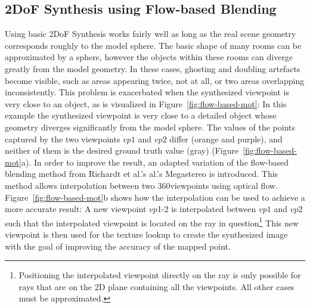 
\subsection{2DoF Synthesis using Flow-based Blending}
Using basic 2DoF Synthesis works fairly well as long as the real scene geometry corresponds roughly to the model sphere. The basic shape of many rooms can be approximated by a sphere, however the objects within these rooms can diverge greatly from the model geometry. In these cases, ghosting and doubling artefacts become visible, such as areas appearing twice, not at all, or two areas overlapping inconsistently. This problem is exacerbated when the synthesized viewpoint is very close to an object, as is visualized in Figure~\ref{fig:flow-based-mot}: In this example the synthesized viewpoint is very close to a detailed object whose geometry diverges significantly from the model sphere. The values of the points captured by the two viewpoints $vp1$ and $vp2$ differ (orange and purple), and neither of them is the desired ground truth value (gray) (Figure~\ref{fig:flow-based-mot}a). In order to improve the result, an adapted variation of the flow-based blending method from Richardt et al.'s al.'s Megastereo \cite{megastereo} is introduced. This method allows interpolation between two 360\degree viewpoints using optical flow. Figure~\ref{fig:flow-based-mot}b shows how the interpolation can be used to achieve a more accurate result: A new viewpoint $vp$1-2 is interpolated between $vp1$ and $vp2$ such that the interpolated viewpoint is located on the ray in question\footnote{Positioning the interpolated viewpoint directly on the ray is only possible for rays that are on the 2D plane containing all the viewpoints. All other cases must be approximated.} This new viewpoint is then used for the texture lookup to create the synthesized image with the goal of improving the accuracy of the mapped point.

